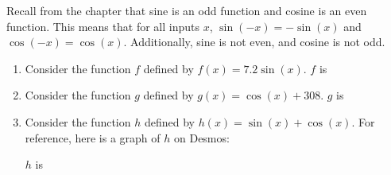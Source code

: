 \documentclass{ximera}
\author{Kenneth Berglund}
\begin{document}
\begin{exercise}
Recall from the chapter that sine is an odd function and cosine is an even function. This means that for all inputs $x$, $\sin(-x) = -\sin(x)$ and $\cos(-x) = \cos(x)$. Additionally, sine is not even, and cosine is not odd. 

\begin{enumerate}
\item Consider the function $f$ defined by $f(x) = 7.2\sin(x)$. $f$ is
\begin{multipleChoice}
\end{multipleChoice}

\item Consider the function $g$ defined by $g(x) = \cos(x) + 308$. $g$ is
\begin{multipleChoice}
\end{multipleChoice}

\item Consider the function $h$ defined by $h(x) = \sin(x) + \cos(x)$. For reference, here is a graph of $h$ on Desmos:
\begin{center}
\end{center}

$h$ is
\begin{multipleChoice}
\end{multipleChoice}

\end{enumerate}

\end{exercise}
\end{document}
